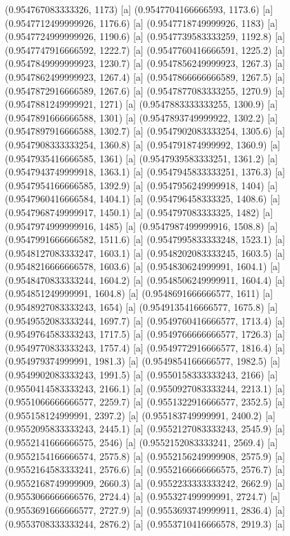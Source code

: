 {{{(0.954767083333326, 1173) [a] 
(0.9547704166666593, 1173.6) [a] 
(0.9547712499999926, 1176.6) [a] 
(0.9547718749999926, 1183) [a] 
(0.9547724999999926, 1190.6) [a] 
(0.9547739583333259, 1192.8) [a] 
(0.9547747916666592, 1222.7) [a] 
(0.9547760416666591, 1225.2) [a] 
(0.9547849999999923, 1230.7) [a] 
(0.9547856249999923, 1267.3) [a] 
(0.9547862499999923, 1267.4) [a] 
(0.9547866666666589, 1267.5) [a] 
(0.9547872916666589, 1267.6) [a] 
(0.9547877083333255, 1270.9) [a] 
(0.9547881249999921, 1271) [a] 
(0.9547883333333255, 1300.9) [a] 
(0.9547891666666588, 1301) [a] 
(0.9547893749999922, 1302.2) [a] 
(0.9547897916666588, 1302.7) [a] 
(0.9547902083333254, 1305.6) [a] 
(0.9547908333333254, 1360.8) [a] 
(0.954791874999992, 1360.9) [a] 
(0.9547935416666585, 1361) [a] 
(0.9547939583333251, 1361.2) [a] 
(0.9547943749999918, 1363.1) [a] 
(0.9547945833333251, 1376.3) [a] 
(0.9547954166666585, 1392.9) [a] 
(0.9547956249999918, 1404) [a] 
(0.9547960416666584, 1404.1) [a] 
(0.954796458333325, 1408.6) [a] 
(0.9547968749999917, 1450.1) [a] 
(0.954797083333325, 1482) [a] 
(0.9547974999999916, 1485) [a] 
(0.9547987499999916, 1508.8) [a] 
(0.9547991666666582, 1511.6) [a] 
(0.9547995833333248, 1523.1) [a] 
(0.9548127083333247, 1603.1) [a] 
(0.9548202083333245, 1603.5) [a] 
(0.9548216666666578, 1603.6) [a] 
(0.954830624999991, 1604.1) [a] 
(0.9548470833333244, 1604.2) [a] 
(0.9548506249999911, 1604.4) [a] 
(0.954851249999991, 1604.8) [a] 
(0.9548691666666577, 1611) [a] 
(0.9548927083333243, 1654) [a] 
(0.9549135416666577, 1675.8) [a] 
(0.9549552083333244, 1697.7) [a] 
(0.9549760416666577, 1713.4) [a] 
(0.9549764583333243, 1717.5) [a] 
(0.9549766666666577, 1726.3) [a] 
(0.9549770833333243, 1757.4) [a] 
(0.9549772916666577, 1816.4) [a] 
(0.954979374999991, 1981.3) [a] 
(0.9549854166666577, 1982.5) [a] 
(0.9549902083333243, 1991.5) [a] 
(0.9550158333333243, 2166) [a] 
(0.9550414583333243, 2166.1) [a] 
(0.9550927083333244, 2213.1) [a] 
(0.9551066666666577, 2259.7) [a] 
(0.9551322916666577, 2352.5) [a] 
(0.955158124999991, 2397.2) [a] 
(0.955183749999991, 2400.2) [a] 
(0.9552095833333243, 2445.1) [a] 
(0.9552127083333243, 2545.9) [a] 
(0.9552141666666575, 2546) [a] 
(0.9552152083333241, 2569.4) [a] 
(0.9552154166666574, 2575.8) [a] 
(0.9552156249999908, 2575.9) [a] 
(0.9552164583333241, 2576.6) [a] 
(0.9552166666666575, 2576.7) [a] 
(0.9552168749999909, 2660.3) [a] 
(0.9552233333333242, 2662.9) [a] 
(0.9553066666666576, 2724.4) [a] 
(0.955327499999991, 2724.7) [a] 
(0.9553691666666577, 2727.9) [a] 
(0.9553693749999911, 2836.4) [a] 
(0.9553708333333244, 2876.2) [a] 
(0.9553710416666578, 2919.3) [a] 
}}}
